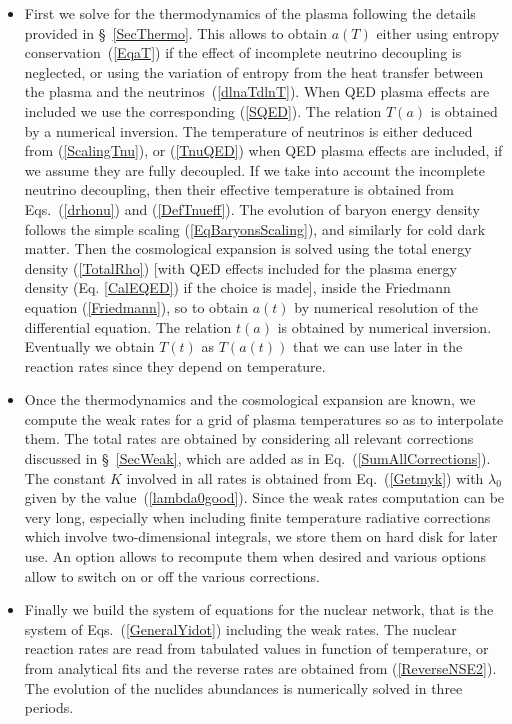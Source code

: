 \documentclass[onecolumn,float,floatfix,preprintnumbers,aps,rmp,nofootinbib,amsmath,amssymb,amsfonts,superscriptaddress,tightenlines]{revtex4}
\newcommand{\myk}{K}
\begin{document}
\begin{itemize}
\item First we solve for the thermodynamics of the plasma following
  the details provided in \S~\ref{SecThermo}. This allows to obtain $a(T)$ either using
entropy conservation~(\ref{EqaT}) if the effect of incomplete neutrino decoupling
is neglected, or using the variation of entropy from the heat transfer
between the plasma and the neutrinos~(\ref{dlnaTdlnT}). When QED
plasma effects are included we use the corresponding (\ref{SQED}). The
relation $T(a)$ is obtained by a numerical inversion. The temperature
of neutrinos is either deduced from (\ref{ScalingTnu}), or
(\ref{TnuQED}) when QED plasma effects are included, if we assume they are
fully decoupled. If we take into account the incomplete neutrino
decoupling, then their effective temperature is obtained from
Eqs.~(\ref{drhonu}) and (\ref{DefTnueff}). The evolution of baryon
energy density follows the simple scaling (\ref{EqBaryonsScaling}),
and similarly for cold dark matter. Then the cosmological expansion is solved using the total energy density
(\ref{TotalRho}) [with QED effects included for the plasma energy
density (Eq. \ref{CalEQED}) if the choice is made], inside the
Friedmann equation (\ref{Friedmann}), so to obtain $a(t)$ by numerical
resolution of the differential equation. The relation $t(a)$ is
obtained by numerical inversion. Eventually we obtain $T(t)$ as
$T(a(t))$ that we can use later in the reaction rates since they
depend on temperature. 

\item Once the thermodynamics and the cosmological expansion are known, we
compute the weak rates for a grid of plasma temperatures so as to
interpolate them. The total rates are obtained by considering all relevant
corrections discussed in \S~\ref{SecWeak}, which are added as in
Eq.~(\ref{SumAllCorrections}). The constant $\myk$ involved in all
rates is obtained from Eq.~(\ref{Getmyk}) with $\lambda_0$ given by
the value~(\ref{lambda0good}).  Since the weak rates computation can
be very long, especially when including finite temperature radiative
corrections which involve two-dimensional integrals, we store them on
hard disk for
later use. An option allows to recompute them when desired and various
options allow to switch on or off the various corrections.

\item Finally we build the system of equations for the nuclear
network, that is the system of Eqs.~(\ref{GeneralYidot}) including the weak rates. The nuclear reaction rates are read from tabulated values in
function of temperature, or from analytical fits and the reverse rates are obtained from
(\ref{ReverseNSE2}). The evolution of the nuclides abundances is numerically solved in three periods.


\end{itemize}
\end{document}
